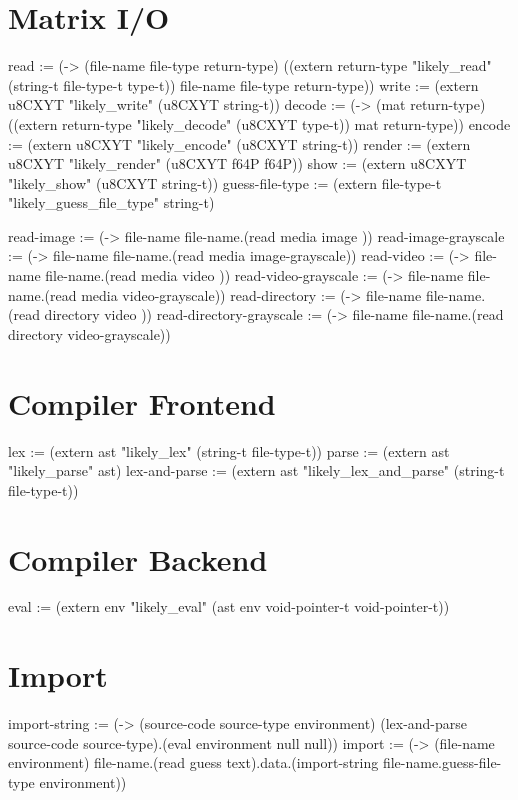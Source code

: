 \documentclass[twoside=false, numbers=noenddot]{scrbook}
\newenvironment{likely}
{ \verbatim }
{ \endverbatim }
\begin{document}
\section{Matrix I/O}
\begin{likely}
read   := (-> (file-name file-type return-type)
              ((extern return-type "likely_read" (string-t file-type-t type-t)) file-name file-type return-type))
write  := (extern u8CXYT "likely_write" (u8CXYT string-t))
decode := (-> (mat return-type)
              ((extern return-type "likely_decode" (u8CXYT type-t)) mat return-type))
encode := (extern u8CXYT "likely_encode" (u8CXYT string-t))
render := (extern u8CXYT "likely_render" (u8CXYT f64P f64P))
show   := (extern u8CXYT "likely_show" (u8CXYT string-t))
guess-file-type := (extern file-type-t "likely_guess_file_type" string-t)
\end{likely}

\begin{likely}
read-image               := (-> file-name file-name.(read media     image          ))
read-image-grayscale     := (-> file-name file-name.(read media     image-grayscale))
read-video               := (-> file-name file-name.(read media     video          ))
read-video-grayscale     := (-> file-name file-name.(read media     video-grayscale))
read-directory           := (-> file-name file-name.(read directory video          ))
read-directory-grayscale := (-> file-name file-name.(read directory video-grayscale))
\end{likely}

\section{Compiler Frontend}
\begin{likely}
lex := (extern ast "likely_lex" (string-t file-type-t))
parse := (extern ast "likely_parse" ast)
lex-and-parse := (extern ast "likely_lex_and_parse" (string-t file-type-t))
\end{likely}

\section{Compiler Backend}
\begin{likely}
eval := (extern env "likely_eval" (ast env void-pointer-t void-pointer-t))
\end{likely}

\section{Import}
\begin{likely}
import-string := (-> (source-code source-type environment) (lex-and-parse source-code source-type).(eval environment null null))
import := (-> (file-name environment) file-name.(read guess text).data.(import-string file-name.guess-file-type environment))
\end{likely}
\end{document}

